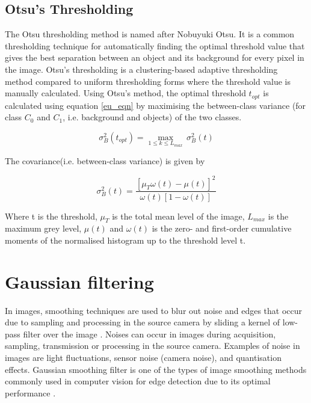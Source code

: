 \subsection*{Otsu’s Thresholding}

The Otsu thresholding method \cite{otsu1979threshold} is named after Nobuyuki Otsu. It is a common thresholding technique for automatically finding the optimal threshold value that gives the best separation between an object and its background for every pixel in the image. Otsu’s thresholding is a clustering-based adaptive thresholding method compared to uniform thresholding forms where the threshold value is manually calculated.
Using Otsu’s method, the optimal threshold $t_{opt}$ is calculated using equation \ref{eu_eqn} by maximising the between-class variance (for class $C_0$ and $C_1$, i.e. background and objects) of the two classes.

\begin{equation} \label{eu_eqn}
\sigma_{B}^{2}(t_{opt}) = \max_{1 \leq k \leq L_{max}} \, \sigma_{B}^{2}(t)
\end{equation}

 The covariance(i.e. between-class variance) is given by 

\begin{equation} \label{e_eqn}
\sigma_{B}^{2}(t) = \frac{{\left[ \mu_T \omega (t) - \mu (t) \right]}^2}{\omega(t) \left[ {1 - \omega(t)} \right] }
\end{equation}


Where t is the threshold, $\mu_T$ is the total mean level of the image, $L_{max}$ is the maximum grey level, $\mu (t)$ and $\omega (t)$ is the zero- and first-order cumulative moments of the normalised histogram up to the threshold level t.






\section{Gaussian filtering}

In images, smoothing techniques are used to blur out noise and edges that occur due to sampling and processing in the source camera by sliding a kernel of low-pass filter over the image \cite{nixon2019feature}. Noises can occur in images during acquisition, sampling, transmission or processing in the source camera. Examples of noise in images are light fluctuations, sensor noise (camera noise), and quantisation effects. Gaussian smoothing filter is one of the types of image smoothing methods commonly used in computer vision for edge detection due to its optimal performance \cite{basu2002gaussian}.


